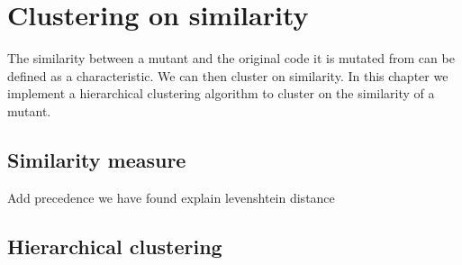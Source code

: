 \documentclass[../main]{subfiles}
\begin{document}
\chapter{Clustering on similarity}
\label{ch:clustering_similarity}
The similarity between a mutant and the original code it is mutated from can be defined as a characteristic. 
We can then cluster on similarity. 
In this chapter we implement a hierarchical clustering algorithm to cluster on the similarity of a mutant.

\section{Similarity measure}
Add precedence we have found
explain levenshtein distance

\section{Hierarchical clustering}
\end{document}
